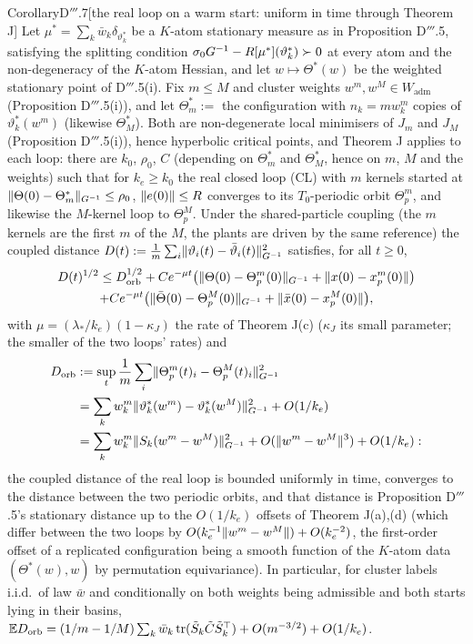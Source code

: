 \begin{thm}{Corollary}{D$'''$.7}[the real loop on a warm start: uniform in time through Theorem J]
Let $\mu^* = \sum_k\bar w_k\delta_{\vartheta^*_k}$ be a $K$-atom stationary measure as in Proposition D$'''$.5,
satisfying the splitting condition $\sigma_0G^{-1} - R[\mu^*](\vartheta^*_k)\succ0$ at every atom and the
non-degeneracy of the $K$-atom Hessian, and let $w\mapsto\Theta^*(w)$ be the weighted stationary point of
D$'''$.5(i). Fix $m\le M$ and cluster weights $w^m, w^M\in W_{\mathrm{adm}}$ (Proposition D$'''$.5(i)), and let
$\Theta^*_m :=$ the configuration with $n_k = mw^m_k$ copies of $\vartheta^*_k(w^m)$ (likewise $\Theta^*_M$). Both are
non-degenerate local minimisers of $J_m$ and $J_M$ (Proposition D$'''$.5(i)), hence hyperbolic critical points, and
Theorem J applies to each loop: there are $k_0$, $\rho_0$, $C$ (depending on $\Theta^*_m$ and $\Theta^*_M$, hence on
$m$, $M$ and the weights) such that for $k_e\ge k_0$ the real closed loop \textup{(CL)} with $m$ kernels started at
$\lVert \Theta(0) - \Theta^*_m\rVert_{G^{-1}}\le\rho_0$, $\lVert e(0)\rVert\le R$ converges to its $T_0$-periodic orbit
$\Theta_p^m$, and likewise the $M$-kernel loop to $\Theta_p^M$. Under the shared-particle coupling (the $m$ kernels
are the first $m$ of the $M$, the plants are driven by the same reference) the coupled distance
$D(t) := \frac1m\sum_i\lVert \vartheta_i(t) - \bar\vartheta_i(t)\rVert^2_{G^{-1}}$ satisfies, for all $t\ge0$,
\begin{multline*}
  D(t)^{1/2}\le D_{\mathrm{orb}}^{1/2} + Ce^{-\mu t}\bigl(\lVert \Theta(0) - \Theta_p^m(0)\rVert_{G^{-1}} + \lVert x(0) - x_p^m(0)\rVert\bigr)\\
  + Ce^{-\mu t}\bigl(\lVert \bar\Theta(0) - \Theta_p^M(0)\rVert_{G^{-1}} + \lVert \bar x(0) - x_p^M(0)\rVert\bigr),
\end{multline*}
with $\mu = (\lambda_*/k_e)(1 - \kappa_J)$ the rate of Theorem J(c) ($\kappa_J$ its small parameter; the smaller of
the two loops' rates) and
\begin{align*}
  D_{\mathrm{orb}} &:= \sup_t\frac1m\sum_i\lVert \Theta_p^m(t)_i - \Theta_p^M(t)_i\rVert^2_{G^{-1}}\\
  &= \sum_kw^m_k\lVert \vartheta^*_k(w^m) - \vartheta^*_k(w^M)\rVert^2_{G^{-1}} + O(1/k_e)\\
  &= \sum_kw^m_k\lVert S_k(w^m - w^M)\rVert^2_{G^{-1}} + O(\lVert w^m - w^M\rVert^3) + O(1/k_e):
\end{align*}
the coupled distance of the real loop is bounded uniformly in time, converges to the distance between the two
periodic orbits, and that distance is Proposition D$'''$.5's stationary distance up to the $O(1/k_e)$ offsets of
Theorem J(a),(d) (which differ between the two loops by $O(k_e^{-1}\lVert w^m - w^M\rVert) + O(k_e^{-2})$, the first-order
offset of a replicated configuration being a smooth function of the $K$-atom data $(\Theta^*(w),w)$ by permutation
equivariance). In particular, for cluster labels i.i.d.\ of law $\bar w$ and conditionally on both weights being
admissible and both starts lying in their basins,
$\mathbb{E} D_{\mathrm{orb}} = (1/m - 1/M)\sum_k\bar w_k\operatorname{tr}(\tilde S_k\tilde C\tilde S_k^\top) + O(m^{-3/2}) + O(1/k_e)$.
\end{thm}
